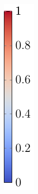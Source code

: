 \documentclass[aspectratio=169,xcolor=dvipsnames,11pt]{beamer}
\begin{document}
\begin{frame}
\begin{figure}
\begin{minipage}{0.03\textwidth}
		\includegraphics[width=\linewidth]{Figures/advection_diffusion_colorbar.pdf}

\end{minipage}
\end{figure}
\end{frame}
\end{document}
